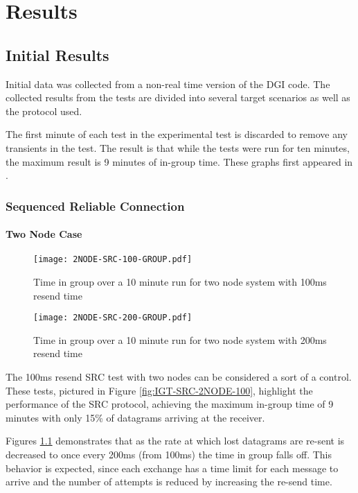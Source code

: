 \chapter{Results}

\section{Initial Results}
Initial data was collected from a non-real time version of the DGI code.
The collected results from the tests are divided into several target scenarios
as well as the protocol used.

The first minute of each test in the experimental test is discarded to remove
any transients in the test. The result is that while the tests were run for
ten minutes, the maximum result is 9 minutes of in-group time. These graphs
first appeared in \cite{CRITIS2012}.

\subsection{Sequenced Reliable Connection}

\subsubsection{Two Node Case}

\begin{figure}
\centering
\begin{minipage}{0.45\textwidth}
    \centering
    \texttt{[image: 2NODE-SRC-100-GROUP.pdf]}
    \caption{Time in group over a 10 minute run for two node system with 100ms resend time}
    \label{fig:IGT-SRC-2NODE-100}
\end{minipage}%
\qquad
\begin{minipage}{0.45\textwidth}
    \centering
    \texttt{[image: 2NODE-SRC-200-GROUP.pdf]}
    \caption{Time in group over a 10 minute run for two node system with 200ms resend time}
    \label{fig:IGT-SRC-2NODE-200}
\end{minipage}
\end{figure}

The 100ms resend SRC test with two nodes can be considered a sort of a control.
These tests, pictured in Figure \ref{fig:IGT-SRC-2NODE-100}, highlight the performance of the
SRC protocol, achieving the maximum in-group time of 9 minutes with only 15\%
of datagrams arriving at the receiver.

Figures \ref{fig:IGT-SRC-2NODE-200} demonstrates that as the
rate at which lost datagrams are re-sent is decreased to once every 200ms (from 100ms) the
time in group falls off. This behavior is expected, since each exchange has a
time limit for each message to arrive and the number of attempts is reduced by
increasing the re-send time.


